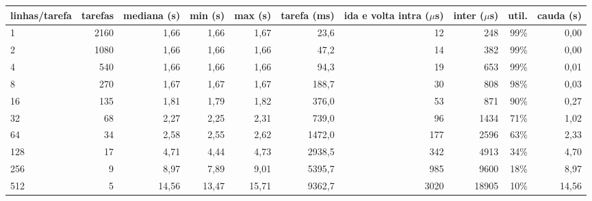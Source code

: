 \begin{tabular}{lrrrrrrrrr}
\toprule
linhas/tarefa & tarefas & mediana (s) & min (s) & max (s) & tarefa (ms) & ida e volta intra ($\mu$s) & inter ($\mu$s) & util. & cauda (s) \\
\midrule
1 & 2160 & 1,66 & 1,66 & 1,67 & 23,6 & 12 & 248 & 99\% & 0,00 \\
2 & 1080 & 1,66 & 1,66 & 1,66 & 47,2 & 14 & 382 & 99\% & 0,00 \\
4 & 540 & 1,66 & 1,66 & 1,66 & 94,3 & 19 & 653 & 99\% & 0,01 \\
8 & 270 & 1,67 & 1,67 & 1,67 & 188,7 & 30 & 808 & 98\% & 0,03 \\
16 & 135 & 1,81 & 1,79 & 1,82 & 376,0 & 53 & 871 & 90\% & 0,27 \\
32 & 68 & 2,27 & 2,25 & 2,31 & 739,0 & 96 & 1434 & 71\% & 1,02 \\
64 & 34 & 2,58 & 2,55 & 2,62 & 1472,0 & 177 & 2596 & 63\% & 2,33 \\
128 & 17 & 4,71 & 4,44 & 4,73 & 2938,5 & 342 & 4913 & 34\% & 4,70 \\
256 & 9 & 8,97 & 7,89 & 9,01 & 5395,7 & 985 & 9600 & 18\% & 8,97 \\
512 & 5 & 14,56 & 13,47 & 15,71 & 9362,7 & 3020 & 18905 & 10\% & 14,56 \\
\bottomrule
\end{tabular}
